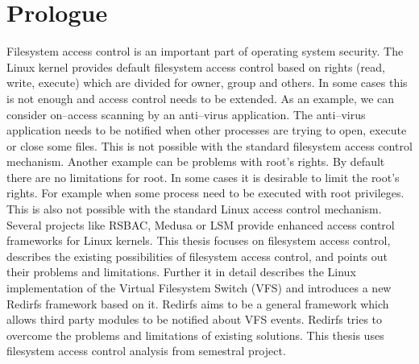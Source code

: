 \chapter{Prologue}
Filesystem access control is an important part of operating system security. The Linux
kernel provides default filesystem access control based on rights (read, write,
execute) which are divided for owner, group and others. In some cases this is not
enough and access control needs to be extended. As an example, we can consider
on--access scanning by an anti--virus application. The anti--virus application needs to
be notified when other processes are trying to open, execute or close some files. This
is not possible with the standard filesystem access control mechanism. Another example
can be problems with root's rights. By default there are no limitations for root. In
some cases it is desirable to limit the root's rights. For example when some process
need to be executed with root privileges. This is also not possible with the standard
Linux access control mechanism. Several projects like RSBAC, Medusa or LSM provide
enhanced access control frameworks for Linux kernels.
This thesis focuses on filesystem access control, describes the existing possibilities
of filesystem access control, and points out their problems and limitations. Further
it in detail describes the Linux implementation of the Virtual Filesystem Switch (VFS)
and introduces a new Redirfs framework based on it. Redirfs aims to be  a general
framework which allows third party modules to be notified about VFS events. Redirfs
tries to overcome the problems and limitations of existing solutions. This thesis uses
filesystem access control analysis from semestral project.

